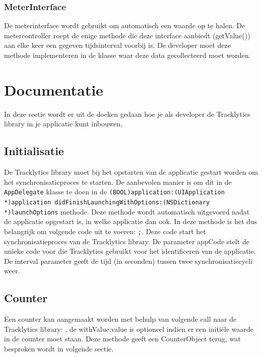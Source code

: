 \subsubsection{MeterInterface}\label{Klassediagram:MeterInferface}
De meterinterface wordt gebruikt om automatisch een waarde op te halen. De metercontroller roept de enige methode die deze interface aanbiedt (getValue()) aan elke keer een gegeven tijdsinterval voorbij is. De developer moet deze methode implementeren in de klasse waar deze data gecollecteerd moet worden.  


\section{Documentatie}\label{documentatie}
In deze sectie wordt er uit de doeken gedaan hoe je als developer de Tracklytics library in je applicatie kunt inbouwen. 


\subsection{Initialisatie}
De Tracklytics library moet bij het opstarten van de applicatie gestart worden om het synchronisatieproces te starten. De aanbevolen manier is om dit in de \texttt{\justify AppDelegate} klasse te doen in de \texttt{\justify (BOOL)application:(UIApplication *)application didFinishLaunchingWithOptions:(NSDictionary *)launchOptions} methode. Deze methode wordt automatisch uitgevoerd nadat de applicatie opgestart is, in welke applicatie dan ook. In deze methode is het dus belangrijk om volgende code uit te voeren: \texttt{;}. Deze code start het synchronisatieproces van de Tracklytics library. De parameter appCode stelt de unieke code voor die Tracklytics gebruikt voor het identificeren van de applicatie. De interval parameter geeft de tijd (in seconden) tussen twee synchronisatiecycli weer. 

\subsection{Counter}
Een counter kan aangemaakt worden met behulp van volgende call naar de Tracklytics library: \texttt{}, de withValue:value is optioneel indien er een initi\"ele waarde in de counter moet staan. Deze methode geeft een CounterObject terug, wat besproken wordt in volgende sectie. \\

